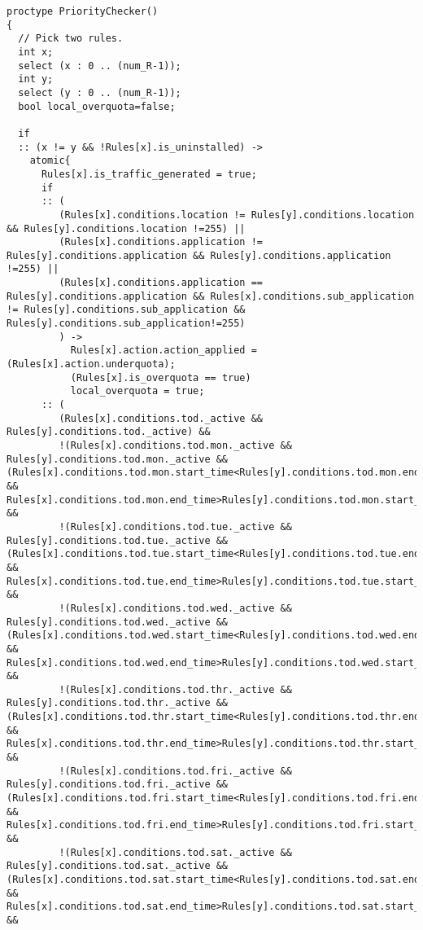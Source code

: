 \singlespacing
\begin{lstlisting}[caption=PriorityChecker Process - Promela Code,
  label=lsl_prioritychecker_r]
proctype PriorityChecker()
{
  // Pick two rules.
  int x;
  select (x : 0 .. (num_R-1)); 
  int y;
  select (y : 0 .. (num_R-1)); 
  bool local_overquota=false;

  if 
  :: (x != y && !Rules[x].is_uninstalled) ->
    atomic{
      Rules[x].is_traffic_generated = true;
      if
      :: (
         (Rules[x].conditions.location != Rules[y].conditions.location && Rules[y].conditions.location !=255) ||
         (Rules[x].conditions.application != Rules[y].conditions.application && Rules[y].conditions.application !=255) ||
         (Rules[x].conditions.application == Rules[y].conditions.application && Rules[x].conditions.sub_application != Rules[y].conditions.sub_application && Rules[y].conditions.sub_application!=255)
         ) -> 
           Rules[x].action.action_applied = (Rules[x].action.underquota);
           (Rules[x].is_overquota == true)
           local_overquota = true;               
      :: (
         (Rules[x].conditions.tod._active && Rules[y].conditions.tod._active) &&
         !(Rules[x].conditions.tod.mon._active && Rules[y].conditions.tod.mon._active && (Rules[x].conditions.tod.mon.start_time<Rules[y].conditions.tod.mon.end_time && Rules[x].conditions.tod.mon.end_time>Rules[y].conditions.tod.mon.start_time)) &&
         !(Rules[x].conditions.tod.tue._active && Rules[y].conditions.tod.tue._active && (Rules[x].conditions.tod.tue.start_time<Rules[y].conditions.tod.tue.end_time && Rules[x].conditions.tod.tue.end_time>Rules[y].conditions.tod.tue.start_time)) &&
         !(Rules[x].conditions.tod.wed._active && Rules[y].conditions.tod.wed._active && (Rules[x].conditions.tod.wed.start_time<Rules[y].conditions.tod.wed.end_time && Rules[x].conditions.tod.wed.end_time>Rules[y].conditions.tod.wed.start_time)) &&
         !(Rules[x].conditions.tod.thr._active && Rules[y].conditions.tod.thr._active && (Rules[x].conditions.tod.thr.start_time<Rules[y].conditions.tod.thr.end_time && Rules[x].conditions.tod.thr.end_time>Rules[y].conditions.tod.thr.start_time)) &&
         !(Rules[x].conditions.tod.fri._active && Rules[y].conditions.tod.fri._active && (Rules[x].conditions.tod.fri.start_time<Rules[y].conditions.tod.fri.end_time && Rules[x].conditions.tod.fri.end_time>Rules[y].conditions.tod.fri.start_time)) &&
         !(Rules[x].conditions.tod.sat._active && Rules[y].conditions.tod.sat._active && (Rules[x].conditions.tod.sat.start_time<Rules[y].conditions.tod.sat.end_time && Rules[x].conditions.tod.sat.end_time>Rules[y].conditions.tod.sat.start_time)) &&

\end{lstlisting}

